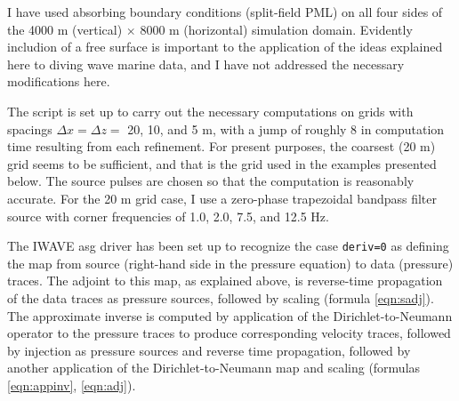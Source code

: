 I have used absorbing boundary conditions (split-field PML) on all four sides of the 4000 m (vertical) $\times$ 8000 m (horizontal) simulation domain. Evidently includion of a free surface is important to the application of the ideas explained here to diving wave marine data, and I have not addressed the necessary modifications here. 

The script is set up to carry out the necessary computations on grids with spacings $\Delta x = \Delta z = $ 20, 10, and 5 m, with a jump of roughly 8 in computation time resulting from each refinement. For present purposes, the coarsest (20 m) grid seems to be sufficient, and that is the grid used in the examples presented below. The source pulses are chosen so that the computation is reasonably accurate. For the 20 m grid case, I use a zero-phase trapezoidal bandpass filter source with corner frequencies of 1.0, 2.0, 7.5, and 12.5 Hz.

The IWAVE asg driver has been set up to recognize the case {\tt deriv=0} as defining the map from source (right-hand side in the pressure equation) to data (pressure) traces. The adjoint to this map, as explained above, is reverse-time propagation of the data traces as pressure sources, followed by scaling (formula \ref{eqn:sadj}). The approximate inverse is computed by application of the Dirichlet-to-Neumann operator to the pressure traces to produce corresponding velocity traces, followed by injection as pressure sources and reverse time propagation, followed by another application of the Dirichlet-to-Neumann map and scaling (formulas \ref{eqn:appinv}, \ref{eqn:adj}).


